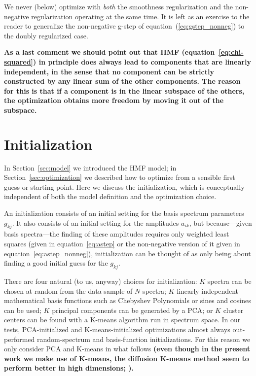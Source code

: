 \documentclass[12pt,preprint]{aastex}
\newcommand{\sectionname}{Section}
\newcommand{\equationname}{equation}
\begin{document}
We never (below) optimize with \emph{both} the smoothness
regularization and the non-negative regularization operating at the
same time.  It is left as an exercise to the reader to generalize the
non-negative g-step of \equationname~(\ref{eq:gstep_nonneg}) to the
doubly regularized case.

\textbf{As a last comment we should point out that HMF (\equationname~\ref{eq:chi-squared}) in principle does always lead to components that are linearly independent, in the sense that no component can be strictly constructed by any linear sum of the other components.  The reason for this is that if a component is in the linear subspace of the others, the optimization obtains more freedom by moving it out of the subspace.}

\section{Initialization}\label{sec:initialization}

In \sectionname~\ref{sec:model} we introduced the HMF model; in
\sectionname~\ref{sec:optimization} we described how to optimize from
a sensible first guess or starting point.  Here we discuss the
initialization, which is conceptually independent of both the model
definition and the optimization choice.

An initialization consists of an initial setting for the basis
spectrum parameters $g_{kj}$.  It also consists of an initial setting
for the amplitudes $a_{ik}$, but because---given basis spectra---the
finding of these amplitudes requires only weighted least squares
(given in \equationname~\ref{eq:astep} or the non-negative version of
it given in \equationname~\ref{eq:astep_nonneg}), initialization can
be thought of as only being about finding a good initial guess for the
$g_{kj}$.

There are four natural (to us, anyway) choices for initialization: $K$
spectra can be chosen at random from the data sample of $N$ spectra;
$K$ linearly independent mathematical basis functions such as
Chebyshev Polynomials or sines and cosines can be used; $K$ principal
components can be generated by a PCA; or $K$ cluster centers can be
found with a K-means algorithm run in spectrum space.  In our tests,
PCA-initialized and K-means-initialized optimizations almost always
out-performed random-spectrum and basis-function initializations.  For
this reason we only consider PCA and K-means in what follows 
\textbf{(even though in the present work we make use of K-means, 
the diffusion K-means method seem to perform better in high dimensions; \citealt{richards}).}
\end{document}
